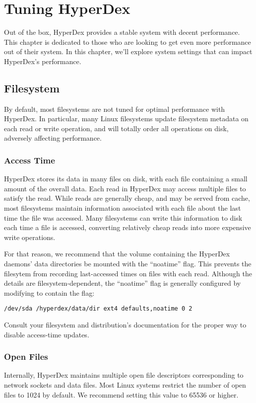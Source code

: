\chapter{Tuning HyperDex}
\label{chap:tuning}

Out of the box, HyperDex provides a stable system with decent performance.  This
chapter is dedicated to those who are looking to get even more performance out
of their system.  In this chapter, we'll explore system settings that can impact
HyperDex's performance.

\section{Filesystem}
\label{sec:tuning:filesystem}

By default, most filesystems are not tuned for optimal performance with
HyperDex.  In particular, many Linux filesystems update filesystem metadata
on each read or write operation, and will totally order all operations on disk,
adversely affecting performance.

\subsection{Access Time}
\label{sec:tuning:atime}

HyperDex stores its data in many files on disk, with each file containing a
small amount of the overall data.  Each read in HyperDex may access multiple
files to satisfy the read.  While reads are generally cheap, and may be served
from cache, most filesystems maintain information associated with each file
about the last time the file was accessed.  Many filesystems can write this
information to disk each time a file is accessed, converting relatively cheap
reads into more expensive write operations.

For that reason, we recommend that the volume containing the HyperDex daemons'
data directories be mounted with the ``noatime'' flag.  This prevents the
filesytem from recording last-accessed times on files with each read.  Although
the details are filesystem-dependent, the ``noatime'' flag is generally
configured by modifying  to contain the flag:

\begin{verbatim}
/dev/sda /hyperdex/data/dir ext4 defaults,noatime 0 2
\end{verbatim}

Consult your filesystem and distribution's documentation for the proper way to
disable access-time updates.

\subsection{Open Files}
\label{sec:tuning:ulimit-n}

Internally, HyperDex maintains multiple open file descriptors corresponding to
network sockets and data files.  Most Linux systems restrict the number of open
files to 1024 by default.  We recommend setting this value to 65536 or higher.

